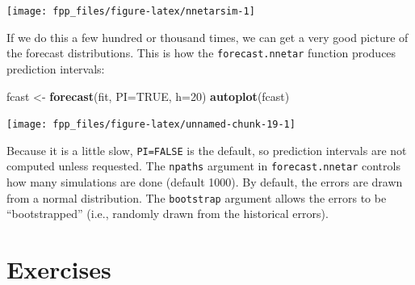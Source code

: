 \documentclass[]{book}
\newenvironment{Shaded}{\begin{snugshade}}{\end{snugshade}}
\newcommand{\DataTypeTok}[1]{\textcolor[rgb]{0.13,0.29,0.53}{#1}}
\newcommand{\DecValTok}[1]{\textcolor[rgb]{0.00,0.00,0.81}{#1}}
\newcommand{\KeywordTok}[1]{\textcolor[rgb]{0.13,0.29,0.53}{\textbf{#1}}}
\newcommand{\NormalTok}[1]{#1}
\newcommand{\OtherTok}[1]{\textcolor[rgb]{0.56,0.35,0.01}{#1}}
\newcommand{\StringTok}[1]{\textcolor[rgb]{0.31,0.60,0.02}{#1}}
\begin{document}
\begin{center}\texttt{[image: fpp\_files/figure-latex/nnetarsim-1]} \end{center}

If we do this a few hundred or thousand times, we can get a very good picture of the forecast distributions. This is how the \texttt{forecast.nnetar} function produces prediction intervals:

\begin{Shaded}
\begin{Highlighting}[]
\NormalTok{fcast <-}\StringTok{ }\KeywordTok{forecast}\NormalTok{(fit, }\DataTypeTok{PI=}\OtherTok{TRUE}\NormalTok{, }\DataTypeTok{h=}\DecValTok{20}\NormalTok{)}
\KeywordTok{autoplot}\NormalTok{(fcast)}
\end{Highlighting}
\end{Shaded}

\begin{center}\texttt{[image: fpp\_files/figure-latex/unnamed-chunk-19-1]} \end{center}

Because it is a little slow, \texttt{PI=FALSE} is the default, so prediction intervals are not computed unless requested. The \texttt{npaths} argument in \texttt{forecast.nnetar} controls how many simulations are done (default 1000). By default, the errors are drawn from a normal distribution. The \texttt{bootstrap} argument allows the errors to be ``bootstrapped'' (i.e., randomly drawn from the historical errors).

\hypertarget{sec-ex-11}{%
\section{Exercises}\label{sec-ex-11}}
\end{document}

